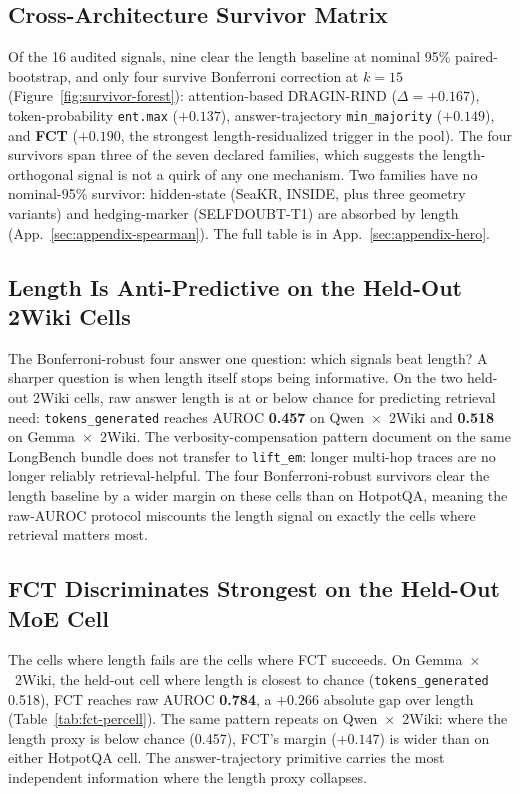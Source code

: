 \documentclass[11pt]{article}
\begin{document}
\subsection{Cross-Architecture Survivor Matrix}
\label{sec:results-matrix}

Of the 16 audited signals, nine clear the length baseline at nominal 95\% paired-bootstrap, and only four survive Bonferroni correction at $k{=}15$ (Figure~\ref{fig:survivor-forest}): attention-based DRAGIN-RIND ($\Delta = +0.167$), token-probability \texttt{ent.max} ($+0.137$), answer-trajectory \texttt{min\_majority} ($+0.149$), and \textbf{FCT} ($+0.190$, the strongest length-residualized trigger in the pool). The four survivors span three of the seven declared families, which suggests the length-orthogonal signal is not a quirk of any one mechanism. Two families have no nominal-95\% survivor: hidden-state (SeaKR, INSIDE, plus three geometry variants) and hedging-marker (SELFDOUBT-T1) are absorbed by length (App.~\ref{sec:appendix-spearman}). The full table is in App.~\ref{sec:appendix-hero}.

\subsection{Length Is Anti-Predictive on the Held-Out 2Wiki Cells}
\label{sec:results-inverted}

The Bonferroni-robust four answer one question: which signals beat length? A sharper question is when length itself stops being informative. On the two held-out 2Wiki cells, raw answer length is at or below chance for predicting retrieval need: \texttt{tokens\_generated} reaches AUROC \textbf{0.457} on Qwen~$\times$~2Wiki and \textbf{0.518} on Gemma~$\times$~2Wiki. The verbosity-compensation pattern \citet{zhang_verbosity_2024} document on the same LongBench bundle does not transfer to \texttt{lift\_em}: longer multi-hop traces are no longer reliably retrieval-helpful. The four Bonferroni-robust survivors clear the length baseline by a wider margin on these cells than on HotpotQA, meaning the raw-AUROC protocol miscounts the length signal on exactly the cells where retrieval matters most.

\subsection{FCT Discriminates Strongest on the Held-Out MoE Cell}
\label{sec:results-fct-percell}

The cells where length fails are the cells where FCT succeeds. On Gemma~$\times$~2Wiki, the held-out cell where length is closest to chance (\texttt{tokens\_generated} 0.518), FCT reaches raw AUROC \textbf{0.784}, a $+0.266$ absolute gap over length (Table~\ref{tab:fct-percell}). The same pattern repeats on Qwen~$\times$~2Wiki: where the length proxy is below chance (0.457), FCT's margin ($+0.147$) is wider than on either HotpotQA cell. The answer-trajectory primitive carries the most independent information where the length proxy collapses.
\end{document}
